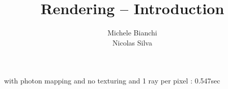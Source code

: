 \documentclass[9pt,a4paper]{scrreprt}
\title{Rendering -- Introduction}
\author{ Michele Bianchi \\ Nicolas Silva }
\begin{document}
\maketitle

\newpage


\newpage
%

\newpage

\newpage

\newpage

\newpage

\newpage

\newpage


with photon mapping and no texturing and 1 ray per pixel : 0.547sec
\end{document}

